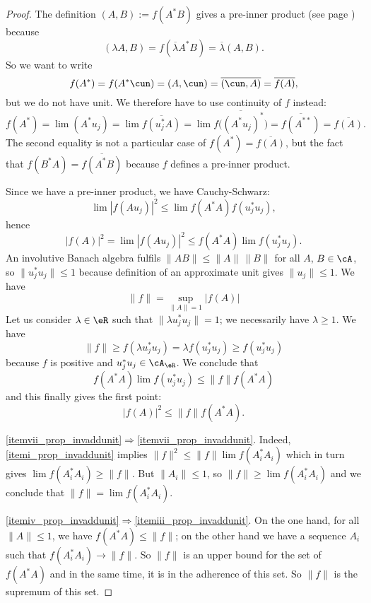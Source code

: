 \begin{proof}
The definition $(A,B):=f(A^*B)$ gives a pre-inner product (see page \pageref{pgdef_preinned}) because 
\[
(\lambda A,B)=f(\overline{ \lambda }A^*B)=\overline{ \lambda }(A,B).
\]
 So we want to write
\[ 
  f(A^*)=f(A^*\cun)=(A,\cun)=\overline{ (\cun,A) }=\overline{ f(A) },
\]
but we do not have unit. We therefore have to use continuity of $f$ instead:
\[ 
f(A^*)=\lim(A^*u_j)
    =\lim\overline{ f(u_j^*A) }
    =\lim\overline{ f\big( (A^*u_j)^* \big) }
    =\overline{ f(A^{**}) }
    =\overline{ f(A) }.
\]
The second equality is not a particular case of $f(A^*)=\overline{ f(A) }$, but the fact that $f(B^*A)=\overline{ f(A^*B) }$ because $f$ defines a pre-inner product.

Since we have a pre-inner product, we have Cauchy-Schwarz:
\[ 
  \lim| f(Au_j) |^2\leq\lim f(A^*A)f(u^*_ju_j),
\]
hence
\begin{equation}
| f(A) |^2=\lim| f(Au_j) |^2\leq f(A^*A)\lim f(u^*_ju_j).
\end{equation}
An involutive Banach algebra fulfils $\| AB \|\leq\| A \|\,\| B \|$ for all $A$, $B\in\cA$, so $\| u^*_ju_j \|\leq 1$ because definition of an approximate unit gives $\| u_j \|\leq 1$. We have
\[ 
  \| f \|=\sup_{\| A \|=1}| f(A) |
\]
Let us consider $\lambda\in\eR$ such that $\| \lambda u_j^*u_j \|=1$; we necessarily have $\lambda\geq 1$. We have
\[ 
  \| f \|\geq f(\lambda u^*_ju_j)=\lambda f(u^*_ju_j)\geq f(u^*_ju_j)
\]
because $f$ is positive and $u^*_ju_j\in\cA_{\eR}$. We conclude that 
\[ 
  f(A^*A)\lim f(u^*_ju_j)\leq \| f \|f(A^*A)
\]
and this finally gives the first point:
\begin{equation}
  | f(A) |^2\leq \| f \|f(A^*A).
\end{equation}

\ref{itemvii_prop_invaddunit}$\Rightarrow$\ref{itemvii_prop_invaddunit}. Indeed, \ref{itemi_prop_invaddunit} implies $\| f \|^2\leq\| f \|\lim f(A_i^*A_i)$ which in turn gives $\lim f(A^*_iA_i)\geq\| f \|$. But $\| A_i \|\leq 1$, so $\| f \|\geq\lim f(A_i^*A_i)$ and we conclude that $\| f \|=\lim f(A_i^*A_i)$.

\ref{itemiv_prop_invaddunit}$\Rightarrow$\ref{itemiii_prop_invaddunit}. On the one hand, for all $\| A \|\leq 1$, we have $f(A^*A)\leq\| f \|$; on the other hand we have a sequence $A_i$ such that $f(A_i^*A_i)\to\| f \|$. So $\| f \|$ is an upper bound for the set of $f(A^*A)$ and in the same time, it is in the adherence of this set. So $\| f \|$ is the supremum of this set. 


\end{proof}
